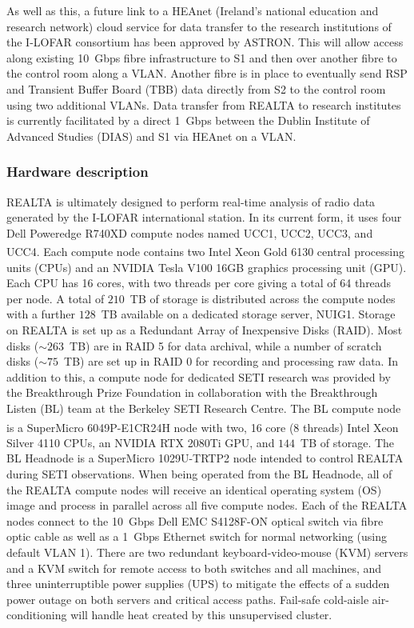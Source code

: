 As well as this, a future link to a HEAnet (Ireland’s national education and research network) cloud service for data transfer to the research institutions of the I-LOFAR consortium has been approved by ASTRON. This will allow access along existing 10~Gbps fibre infrastructure to S1 and then over another fibre to the control room along a VLAN. Another fibre is in place to eventually send RSP and Transient Buffer Board (TBB) data directly from S2 to the control room using two additional VLANs.
Data transfer from REALTA to research institutes is currently facilitated by a direct 1~Gbps between the Dublin Institute of Advanced Studies (DIAS) and S1 via HEAnet on a VLAN.

\subsubsection{Hardware description}
REALTA is ultimately designed to perform real-time analysis of radio data generated by the I-LOFAR international station. In its current form, it uses four Dell Poweredge R740XD compute nodes named UCC1, UCC2, UCC3, and UCC4. Each compute node contains two Intel Xeon\textsuperscript{\textregistered} Gold 6130 central processing units (CPUs) and an NVIDIA Tesla V100 16GB graphics processing unit (GPU). Each CPU has 16 cores, with two threads per core giving a total of 64 threads per node.  A total of $210$~TB of storage is distributed across the compute nodes with a further $128$~TB available on a dedicated storage server, NUIG1. Storage on REALTA is set up as a Redundant Array of Inexpensive Disks (RAID). Most disks ($\sim 263$~TB) are in RAID 5 for data archival, while a number of scratch disks ($\sim 75$~TB) are set up in RAID 0 for recording and processing raw data. In addition to this, a compute node for dedicated SETI research was provided by the Breakthrough Prize Foundation in collaboration with the Breakthrough Listen (BL) team at the Berkeley SETI Research Centre. The BL compute node is a SuperMicro 6049P-E1CR24H node with two, 16 core (8 threads) Intel Xeon\textsuperscript{\textregistered} Silver 4110 CPUs, an NVIDIA RTX 2080Ti GPU, and $144$~TB of storage. The BL Headnode is a SuperMicro 1029U-TRTP2 node intended to control REALTA during SETI observations. When being operated from the BL Headnode, all of the REALTA compute nodes will receive an identical operating system (OS) image and process in parallel across all five compute nodes. Each of the REALTA nodes connect to the 10~Gbps Dell EMC S4128F-ON optical switch via fibre optic cable as well as a 1~Gbps Ethernet switch for normal networking (using default VLAN 1). There are two redundant keyboard-video-mouse (KVM) servers and a KVM switch for remote access to both switches and all machines, and three uninterruptible power supplies (UPS) to mitigate the effects of a sudden power outage on both servers and critical access paths. Fail-safe cold-aisle air-conditioning will handle heat created by this unsupervised cluster.

